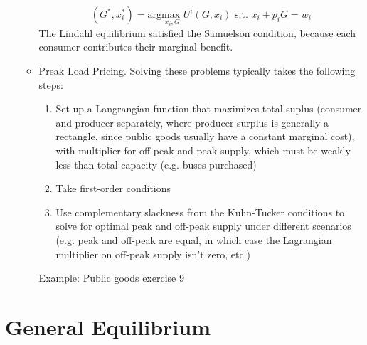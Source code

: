 \documentclass{article}
\newcommand{\usmax}[1]{\underset{#1}{\text{max }}}
\newcommand{\red}[1]{{\color{red}#1}}
\newcommand{\blue}[1]{{\color{blue}#1}}
\begin{document}
\begin{itemize}
\begin{itemize}
\[					(G^*,x_i^*) = \text{arg}\usmax{x_i,G}U^i(G,x_i)\text{ s.t. }x_i + p_iG = w_i
				\]
				The Lindahl equilibrium satisfied the Samuelson condition, because each consumer contributes their marginal benefit.
			\item \blue{Preak Load Pricing}. Solving these problems typically takes the following steps:
				\begin{enumerate}
					\item Set up a Langrangian function that maximizes total suplus (consumer and producer separately, where producer surplus is generally a rectangle, since public goods usually have a constant marginal cost), with multiplier for off-peak and peak supply, which must be weakly less than total capacity (e.g. buses purchased)
					\item Take first-order conditions
					\item Use complementary slackness from the Kuhn-Tucker conditions to solve for optimal peak and off-peak supply under different scenarios (e.g. peak and off-peak are equal, in which case the Lagrangian multiplier on off-peak supply isn't zero, etc.)
				\end{enumerate}
				\red{Example: Public goods exercise 9}
		\end{itemize}
\end{itemize}

\pagebreak
\section{General Equilibrium}


\end{document}
